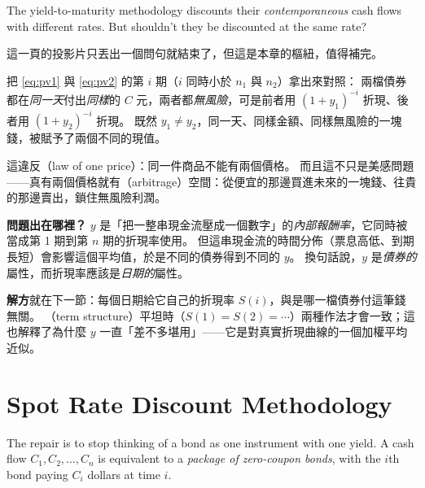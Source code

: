
The yield-to-maturity methodology discounts their \emph{contemporaneous} cash flows with different rates.
But shouldn't they be discounted at the same rate?

\suppstart
\begin{remark}
	這一頁的投影片只丟出一個問句就結束了，但這是本章的樞紐，值得補完。

	把 \eqref{eq:pv1} 與 \eqref{eq:pv2} 的第 $i$ 期（$i$ 同時小於 $n_1$ 與 $n_2$）拿出來對照：
	兩檔債券都在\emph{同一天}付出\emph{同樣}的 $C$ 元，兩者都\emph{無風險}，可是前者用 $(1+y_1)^{-i}$ 折現、後者用 $(1+y_2)^{-i}$ 折現。
	既然 $y_1 \neq y_2$，同一天、同樣金額、同樣無風險的一塊錢，被賦予了兩個不同的現值。

	這違反（law of one price）：同一件商品不能有兩個價格。
	而且這不只是美感問題——真有兩個價格就有（arbitrage）空間：從便宜的那邊買進未來的一塊錢、往貴的那邊賣出，鎖住無風險利潤。

	\textbf{問題出在哪裡？}
	$y$ 是「把一整串現金流壓成一個數字」的\emph{內部報酬率}，它同時被當成第 1 期到第 $n$ 期的折現率使用。
	但這串現金流的時間分佈（票息高低、到期長短）會影響這個平均值，於是不同的債券得到不同的 $y$。
	換句話說，$y$ 是\emph{債券的}屬性，而折現率應該是\emph{日期的}屬性。

	\textbf{解方}就在下一節：每個日期給它自己的折現率 $S(i)$，與是哪一檔債券付這筆錢無關。
	（term structure）平坦時（$S(1)=S(2)=\cdots$）兩種作法才會一致；這也解釋了為什麼 $y$ 一直「差不多堪用」——它是對真實折現曲線的一個加權平均近似。
\end{remark}
\suppend

\section{Spot Rate Discount Methodology}
\label{sec:spot-discount}


The repair is to stop thinking of a bond as one instrument with one yield.
A cash flow $C_{1},C_{2},\ldots,C_{n}$ is equivalent to a \emph{package of zero-coupon bonds}, with the $i$th bond paying $C_{i}$ dollars at time $i$.

